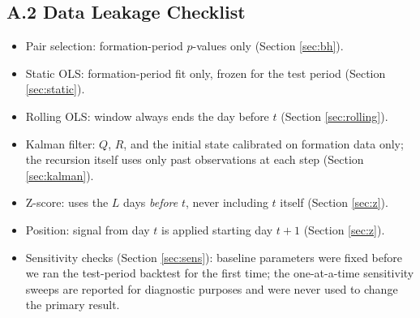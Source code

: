 \documentclass[11pt,a4paper]{article}
\begin{document}
\subsection*{A.2 Data Leakage Checklist}
\begin{itemize}[nosep]
  \item Pair selection: formation-period $p$-values only (Section \ref{sec:bh}).
  \item Static OLS: formation-period fit only, frozen for the test period (Section \ref{sec:static}).
  \item Rolling OLS: window always ends the day before $t$ (Section \ref{sec:rolling}).
  \item Kalman filter: $Q$, $R$, and the initial state calibrated on formation data only; the recursion itself uses only past observations at each step (Section \ref{sec:kalman}).
  \item Z-score: uses the $L$ days \emph{before} $t$, never including $t$ itself (Section \ref{sec:z}).
  \item Position: signal from day $t$ is applied starting day $t+1$ (Section \ref{sec:z}).
  \item Sensitivity checks (Section \ref{sec:sens}): baseline parameters were fixed before we ran the test-period backtest for the first time; the one-at-a-time sensitivity sweeps are reported for diagnostic purposes and were never used to change the primary result.
\end{itemize}
\end{document}
